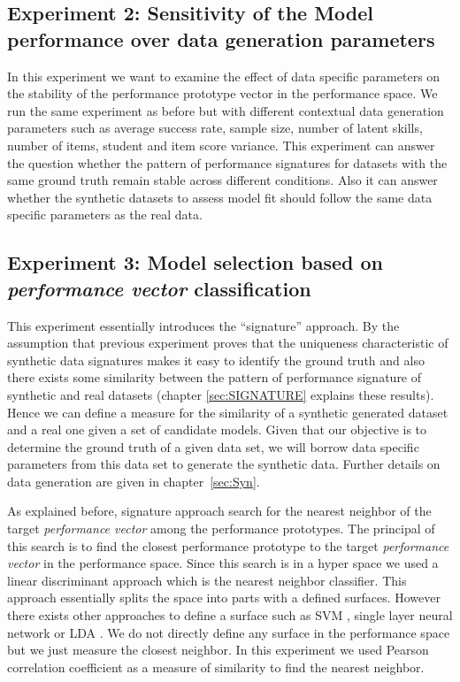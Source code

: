 
\subsection{Experiment 2: Sensitivity of the Model performance over data generation parameters}
\label{Sensitive}

In this experiment we want to examine the effect of data specific parameters on the stability of the performance prototype vector in the performance space. We run the same experiment as before but with different contextual data generation parameters such as average success rate, sample size, number of latent skills, number of items, student and item score variance. This experiment can answer the question whether the pattern of performance signatures for datasets with the same ground truth remain stable across different conditions. Also it can answer whether the synthetic datasets to assess model fit should follow the same data specific parameters as the real data.


\subsection{Experiment 3: Model selection based on \textit{performance vector} classification}
\label{Sigapproach-measure}
This experiment essentially introduces the ``signature'' approach. By the assumption that previous experiment proves that the uniqueness characteristic of synthetic data signatures makes it easy to identify the ground truth and also there exists some similarity between the pattern of performance signature of synthetic and real datasets (chapter \ref{sec:SIGNATURE} explains these results). Hence we can define a measure for the similarity of a synthetic generated dataset and a real one given a set of candidate models. Given that our objective is to determine the ground truth of a given data set, we will borrow data specific parameters from this data set to generate the synthetic data.  Further details on data generation are given in chapter~\ref{sec:Syn}. 

As explained before, signature approach search for the nearest neighbor of the target \textit{performance vector} among the performance prototypes. The principal of this search is to find the closest performance prototype to the target \textit{performance vector} in the performance space. Since this search is in a hyper space we used a linear discriminant approach which is the nearest neighbor classifier. This approach essentially splits the space into parts with a defined surfaces. However there exists other approaches to define a surface such as SVM \citep{cortes1995support}, single layer neural network \citep{lippmann1987introduction} or LDA \citep{blei2003latent}. We do not directly define any surface in the performance space but we just measure the closest neighbor. In this experiment we used Pearson correlation coefficient as a measure of similarity to find the nearest neighbor.

